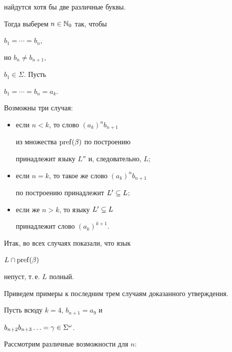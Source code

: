 \begin{pf}
\begin{itemize}
найдутся хотя бы две различные буквы.


Тогда выберем $n\in\Bbb N_0$ так, чтобы


$b_1=\dotsb=b_n$,


но $b_n\ne b_{n+1}$,


$b_1\in\Sigma$. Пусть


$b_1 =\dotsb=b_n=a_k$.


Возможны три случая:


\begin{itemize}


\item[--] если $n<k$, то слово $(a_k)^nb_{n+1}$


из множества $\operatorname{pref}(\beta)$ по построению


принадлежит языку $L''$ и, следовательно, $L$;


\item[--] если $n=k$, то такое же слово $(a_k)^nb_{n+1}$


по построению принадлежит $L'\subseteq L$;


\item[--] если же $n>k$, то языку $L'\subseteq L$


принадлежит слово $(a_k)^{k+1}$.


\end{itemize}


\end{itemize}





Итак, во всех случаях показали, что язык


$L\cap\operatorname{pref}(\beta)$


непуст, т.\,е. $L$ полный.


\end{pf}





Приведем примеры к последним трем случаям доказанного утверждения.


 Пусть всюду $k=4$, $b_{n+1}=a_9$ и


$b_{n+2}b_{n+3}\ldots=\gamma\in\Sigma^\omega$.


Рассмотрим различные возможности для $n$:


